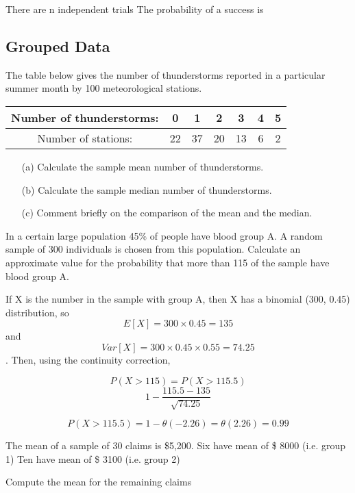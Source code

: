 \documentclass[]{report}
\begin{document}
{There are n independent trials
The probability of a success is









\subsection{Grouped Data}

The table below gives the number of thunderstorms reported in a particular summer
month by 100 meteorological stations.

\begin{tabular}{|c|c|c|c|c|c|c|}
Number of thunderstorms: &0& 1 &2 &3 &4 &5 \\ \hline
Number of stations: & 22 & 37 & 20 & 13 & 6 & 2 \\ \hline
\end{tabular}

\begin{itemize}
\item[(a)] Calculate the sample mean number of thunderstorms.
\item[(b)] Calculate the sample median number of thunderstorms.
\item[(c)] Comment briefly on the comparison of the mean and the median.
\end{itemize}
In a certain large population 45\% of people have blood group A. 
A random sample of 300 individuals is chosen from this population.
Calculate an approximate value for the probability that more than 115 of the sample
have blood group A.

If X is the number in the sample with group A, then X has a binomial (300, 0.45)
distribution, so
\[ E[X] = 300 \times 0.45 = 135 \] and 
\[ Var[X] = 300 \times 0.45 \times 0.55 = 74.25 \].
Then, using the continuity correction,

\[ P(X > 115) = P(X > 115.5)\]
\[ 1- \frac{115.5 - 135}{\sqrt{74.25} } \]


\[  P(X > 115.5) = 1 -\theta(-2.26) = \theta(2.26) = 0.99\]

The mean of a sample of 30 claims is \$5,200.
Six have mean of \$ 8000 (i.e. group 1)
Ten have mean of \$ 3100 (i.e. group 2)

Compute the mean for the remaining claims

}
\end{document}
